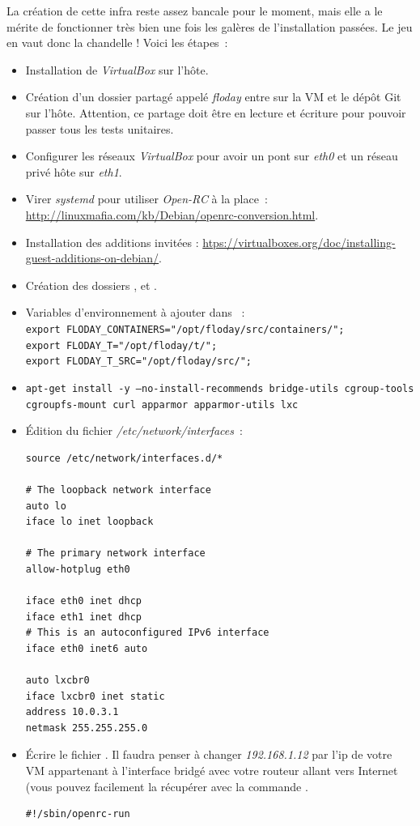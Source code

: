 La création de cette infra reste assez bancale pour le moment, mais elle a le mérite de fonctionner très bien une fois les galères de l'installation passées.
Le jeu en vaut donc la chandelle !
Voici les étapes~:
\begin{itemize}
	\item Installation de \emph{VirtualBox} sur l'hôte.
	\item Création d'un dossier partagé appelé \emph{floday} entre  sur la VM et le dépôt Git sur l'hôte. Attention, ce partage doit être en lecture et écriture pour pouvoir passer tous les tests unitaires.
	\item Configurer les réseaux \emph{VirtualBox} pour avoir un pont sur \emph{eth0} et un réseau privé hôte sur \emph{eth1}.
	\item Virer \emph{systemd} pour utiliser \emph{Open-RC} à la place~: \url{http://linuxmafia.com/kb/Debian/openrc-conversion.html}.
	\item Installation des additions invitées : \url{htps://virtualboxes.org/doc/installing-guest-additions-on-debian/}.
	\item Création des dossiers ,  et .
	\item Variables d'environnement à ajouter dans ~:\\
{\tt export FLODAY\_CONTAINERS="/opt/floday/src/containers/";\\
export FLODAY\_T="/opt/floday/t/";\\
export FLODAY\_T\_SRC="/opt/floday/src/";}
	\item {\tt{}apt-get install -y --no-install-recommends bridge-utils cgroup-tools\\
		cgroupfs-mount curl apparmor apparmor-utils lxc}
	\item Édition du fichier \emph{/etc/network/interfaces}~:\\
		\begin{lstlisting}
source /etc/network/interfaces.d/*

# The loopback network interface
auto lo
iface lo inet loopback

# The primary network interface
allow-hotplug eth0

iface eth0 inet dhcp
iface eth1 inet dhcp
# This is an autoconfigured IPv6 interface
iface eth0 inet6 auto

auto lxcbr0
iface lxcbr0 inet static
address 10.0.3.1
netmask 255.255.255.0
		\end{lstlisting}
	\item Écrire le fichier .
		Il faudra penser à changer \emph{192.168.1.12} par l'ip de votre VM appartenant à l'interface bridgé avec votre routeur allant vers Internet (vous pouvez facilement la récupérer avec la commande .\\
	\begin{lstlisting}
#!/sbin/openrc-run


\end{lstlisting}
\end{itemize}
